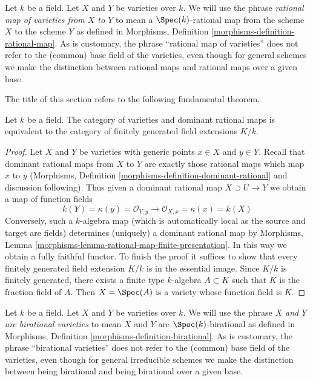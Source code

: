 \noindent
Let $k$ be a field. Let $X$ and $Y$ be varieties over $k$.
We will use the phrase {\it rational map of varieties from $X$ to $Y$}
to mean a $\Spec(k)$-rational map from the scheme $X$ to the scheme $Y$
as defined in Morphisms, Definition \ref{morphisms-definition-rational-map}.
As is customary, the phrase ``rational map of varieties''
does not refer to the (common) base field of the varieties,
even though for general schemes we make the distinction between
rational maps and rational maps over a given base.

\medskip\noindent
The title of this section refers to the following fundamental theorem.

\begin{theorem}
\label{theorem-varieties-rational-maps}
Let $k$ be a field. The category of varieties and
dominant rational maps is equivalent to the category of
finitely generated field extensions $K/k$.
\end{theorem}

\begin{proof}
Let $X$ and $Y$ be varieties with generic points $x \in X$ and $y \in Y$.
Recall that dominant rational maps from $X$ to $Y$ are exactly those
rational maps which map $x$ to $y$
(Morphisms, Definition \ref{morphisms-definition-dominant-rational}
and discussion following).
Thus given a dominant rational map $X \supset U \to Y$ we obtain a map of
function fields
$$
k(Y) = \kappa(y) = \mathcal{O}_{Y, y}
\longrightarrow
\mathcal{O}_{X, x} = \kappa(x) = k(X)
$$
Conversely, such a $k$-algebra map (which is automatically local as the
source and target are fields) determines (uniquely) a dominant rational
map by Morphisms, Lemma \ref{morphisms-lemma-rational-map-finite-presentation}.
In this way we obtain a fully faithful functor.
To finish the proof it suffices to show that every finitely generated
field extension $K/k$ is in the essential image.
Since $K/k$ is finitely generated, there exists a finite type
$k$-algebra $A \subset K$ such that $K$ is the fraction field of $A$.
Then $X = \Spec(A)$ is a variety whose function field is $K$.
\end{proof}

\noindent
Let $k$ be a field. Let $X$ and $Y$ be varieties over $k$.
We will use the phrase {\it $X$ and $Y$ are birational varieties}
to mean $X$ and $Y$ are $\Spec(k)$-birational
as defined in Morphisms, Definition \ref{morphisms-definition-birational}.
As is customary, the phrase ``birational varieties''
does not refer to the (common) base field of the varieties,
even though for general irreducible schemes we make the distinction between
being birational and being birational over a given base.


